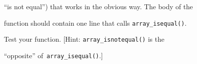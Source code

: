   ``is not equal'') that works in the obvious way. The body of the

  function should contain one line that calls \texttt{array\_isequal()}.

  Test your function. [Hint: \texttt{array\_isnotequal()} is the

  ``opposite'' of\texttt{ array\_isequal()}.]


